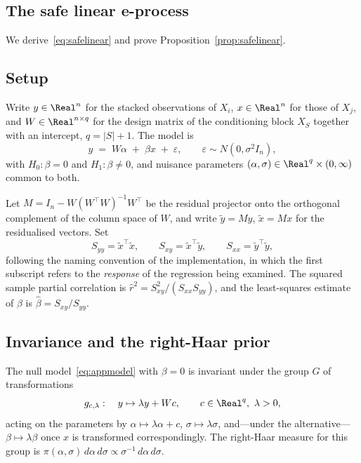 
\begin{appendices}

\section{The safe linear e-process}\label{app:safelinear}

We derive~\eqref{eq:safelinear} and prove Proposition~\ref{prop:safelinear}.

\subsection{Setup}

Write $y \in \Real^n$ for the stacked observations of $X_i$, $x \in \Real^n$
for those of $X_j$, and $W \in \Real^{n \times q}$ for the design matrix of
the conditioning block $X_S$ together with an intercept, $q = |S| + 1$. The
model is
\begin{equation}\label{eq:appmodel}
y \;=\; W\alpha \;+\; \beta x \;+\; \varepsilon,
\qquad \varepsilon \sim N(0, \sigma^2 I_n),
\end{equation}
with $H_0 : \beta = 0$ and $H_1 : \beta \neq 0$, and nuisance parameters
$(\alpha, \sigma) \in \Real^q \times (0,\infty)$ common to both.

Let $M = I_n - W(W^\top W)^{-1} W^\top$ be the residual projector onto the
orthogonal complement of the column space of $W$, and write
$\tilde y = My$, $\tilde x = Mx$ for the residualised vectors. Set
\begin{equation*}
S_{yy} = \tilde x^\top \tilde x, \qquad
S_{xy} = \tilde x^\top \tilde y, \qquad
S_{xx} = \tilde y^\top \tilde y,
\end{equation*}
following the naming convention of the implementation, in which the first
subscript refers to the \emph{response} of the regression being examined. The
squared sample partial correlation is
$\hat r^2 = S_{xy}^2 / (S_{xx} S_{yy})$, and the least-squares estimate of
$\beta$ is $\hat\beta = S_{xy}/S_{yy}$.

\subsection{Invariance and the right-Haar prior}

The null model~\eqref{eq:appmodel} with $\beta = 0$ is invariant under the
group $G$ of transformations
\begin{equation*}
g_{c,\lambda} : \quad y \mapsto \lambda y + Wc,
\qquad c \in \Real^q, \ \lambda > 0,
\end{equation*}
acting on the parameters by $\alpha \mapsto \lambda\alpha + c$,
$\sigma \mapsto \lambda\sigma$, and---under the alternative---$\beta \mapsto
\lambda\beta$ once $x$ is transformed correspondingly. The right-Haar measure
for this group is $\pi(\alpha,\sigma)\,d\alpha\,d\sigma \propto
\sigma^{-1}\,d\alpha\,d\sigma$.


\end{appendices}
